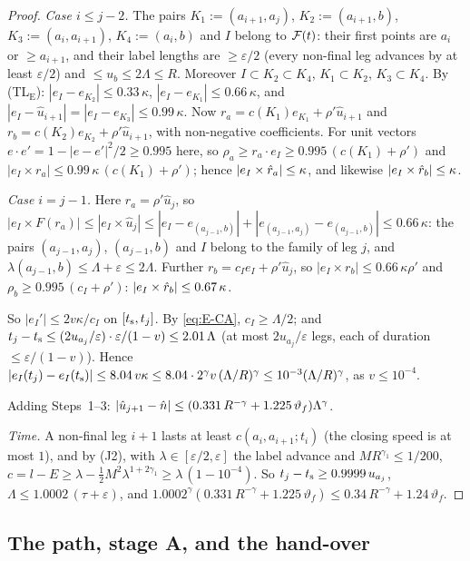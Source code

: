 \begin{proof}
\emph{Case $i\le j-2$.} The pairs $K_1:=(a_{i+1},a_j)$, $K_2:=(a_{i+1},b)$, $K_3:=(a_i,a_{i+1})$, $K_4:=(a_i,b)$ and $I$ belong to
$\mathcal F(t)$: their first points are $a_i$ or $\ge a_{i+1}$, and their label lengths are $\ge\varepsilon/2$ (every non-final leg
advances by at least $\varepsilon/2$) and $\le u_b\le2\Lambda\le R$. Moreover $I\subset K_2\subset K_4$, $K_1\subset K_2$,
$K_3\subset K_4$. By (TL$_{\mathrm E}$): $|e_I-e_{K_2}|\le0.33\,\kappa$, $|e_I-e_{K_1}|\le0.66\,\kappa$, and
$|e_I-\hat u_{i+1}|=|e_I-e_{K_3}|\le0.99\,\kappa$. Now $r_a=c(K_1)e_{K_1}+\rho'\hat u_{i+1}$ and
$r_b=c(K_2)e_{K_2}+\rho'\hat u_{i+1}$, with non-negative coefficients. For unit vectors $e\cdot e'=1-|e-e'|^2/2\ge0.995$ here,
so $\rho_a\ge r_a\cdot e_I\ge0.995\,(c(K_1)+\rho')$ and $|e_I\times r_a|\le0.99\,\kappa\,(c(K_1)+\rho')$; hence
$|e_I\times\hat r_a|\le\kappa$, and likewise $|e_I\times\hat r_b|\le\kappa$.

\emph{Case $i=j-1$.} Here $r_a=\rho'\hat u_j$, so
$|e_I\times F(r_a)|\le|e_I\times\hat u_j|\le|e_I-e_{(a_{j-1},b)}|+|e_{(a_{j-1},a_j)}-e_{(a_{j-1},b)}|\le0.66\,\kappa$: the pairs
$(a_{j-1},a_j)$, $(a_{j-1},b)$ and $I$ belong to the family of leg $j$, and $\lambda(a_{j-1},b)\le\Lambda+\varepsilon\le2\Lambda$.
Further $r_b=c_Ie_I+\rho'\hat u_j$, so $|e_I\times r_b|\le0.66\,\kappa\rho'$ and $\rho_b\ge0.995\,(c_I+\rho')$:
$|e_I\times\hat r_b|\le0.67\,\kappa$.

So $|e_I'|\le2v\kappa/c_I$ on $[t_{\mathrm s},t_j]$. By \eqref{eq:E-CA}, $c_I\ge\Lambda/2$; and
$t_j-t_{\mathrm s}\le(2u_{a_j}/\varepsilon)\cdot\varepsilon/(1-v)\le2.01\,\Lambda$ (at most $2u_{a_j}/\varepsilon$ legs, each of duration
$\le\varepsilon/(1-v)$). Hence
$|e_I(t_j)-e_I(t_{\mathrm s})|\le8.04\,v\kappa\le8.04\cdot2^\gamma v\,(\Lambda/R)^\gamma\le10^{-3}(\Lambda/R)^\gamma$, as $v\le10^{-4}$.

Adding Steps~1--3: $|\hat u_{j+1}-\hat n|\le(0.331\,R^{-\gamma}+1.225\,\vartheta_f)\Lambda^\gamma$.

\emph{Time.} A non-final leg $i+1$ lasts at least $c(a_i,a_{i+1};t_i)$ (the closing speed is at most $1$), and by (J2), with
$\lambda\in[\varepsilon/2,\varepsilon]$ the label advance and $MR^{\gamma_1}\le1/200$,
$c=l-E\ge\lambda-\frac12M^2\lambda^{1+2\gamma_1}\ge\lambda\,(1-10^{-4})$. So $t_j-t_{\mathrm s}\ge0.9999\,u_{a_j}$,
$\Lambda\le1.0002\,(\tau+\varepsilon)$, and $1.0002^\gamma(0.331\,R^{-\gamma}+1.225\,\vartheta_f)\le0.34\,R^{-\gamma}+1.24\,\vartheta_f$.
\end{proof}

\subsection{The path, stage A, and the hand-over}

